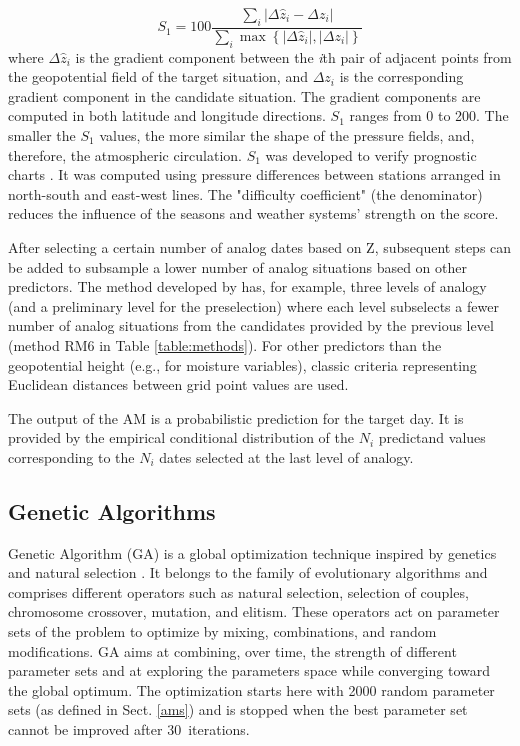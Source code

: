 \documentclass[draft]{agujournal2019}
\begin{document}
\begin{equation}
	\label{eq:S1}
	S_{1}=100 \frac {
        \displaystyle \sum_{i} 
            \vert \Delta\hat{z}_{i} - 
            \Delta z_{i} \vert
    }
	{
        \displaystyle \sum_{i} \max\left\lbrace 
            \vert \Delta\hat{z}_{i} \vert , 
            \vert \Delta z_{i} \vert \right
        \rbrace 
    }
\end{equation}
where $\Delta \hat{z}_{i}$ is the gradient component between the \textit{i}th pair of adjacent points from the geopotential field of the target situation, and $\Delta z_{i}$ is the corresponding gradient component in the candidate situation. The gradient components are computed in both latitude and longitude directions. $S_{1}$ ranges from 0 to 200. The smaller the $S_{1}$ values, the more similar the shape of the pressure fields, and, therefore, the atmospheric circulation. $S_{1}$ was developed to verify prognostic charts \cite{Teweles1954}. It was computed using pressure differences between stations arranged in north-south and east-west lines. The "difficulty coefficient" (the denominator) reduces the influence of the seasons and weather systems' strength on the score.

After selecting a certain number of analog dates based on Z, subsequent steps can be added to subsample a lower number of analog situations based on other predictors. The method developed by  has, for example, three levels of analogy (and a preliminary level for the preselection) where each level subselects a fewer number of analog situations from the candidates provided by the previous level (method RM6 in Table \ref{table:methods}). For other predictors than the geopotential height (e.g., for moisture variables), classic criteria representing Euclidean distances between grid point values are used.

The output of the AM is a probabilistic prediction for the target day. It is provided by the empirical conditional distribution of the $N_{i}$ predictand values corresponding to the $N_{i}$ dates selected at the last level of analogy.


\subsection{Genetic Algorithms}
\label{gas}

Genetic Algorithm (GA) is a global optimization technique inspired by genetics and natural selection \cite{Holland1992b}. It belongs to the family of evolutionary algorithms and comprises different operators such as natural selection, selection of couples, chromosome crossover, mutation, and elitism. These operators act on parameter sets of the problem to optimize by mixing, combinations, and random modifications. GA aims at combining, over time, the strength of different parameter sets and at exploring the parameters space while converging toward the global optimum. The optimization starts here with 2000 random parameter sets (as defined in Sect. \ref{ams}) and is stopped when the best parameter set cannot be improved after 30~iterations.
\end{document}
